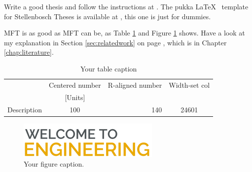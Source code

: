Write a good thesis and follow the instructions at \cite{sun_thesis_guide}. The pukka \LaTeX ~ template for Stellenbosch Theses is available at \cite{sun_latex_template}, this one is just for dummies.


\Ac{MFT} is as good as \ac{MFT} can be, as Table \ref{tab:my_label} and Figure \ref{fig:enter-label} shows.
Have a look at my explanation in Section \ref{sec:relatedwork} on page \pageref{sec:relatedwork}, which is in Chapter \ref{chap:literature}.



\begin{table}[H]
    \caption{Your table caption}
    \footnotesize
    \centering
    \begin{tabular}{ccrp{3cm}}    %
    \toprule
         & Centered number & R-aligned number &  Width-set col\\
         & [Units] & & \\
    \midrule
        Description & 100 & 140 & \multicolumn{1}{c}{24601}\\
    \bottomrule
    \end{tabular}
    \label{tab:my_label}
\end{table}

\begin{figure}
    \centering
    \includegraphics[width=0.8\linewidth]{figures/Faculty-of-Engineering-Stellenbosch-University-Logo.png}
    \caption{Your figure caption.}
    \label{fig:enter-label}
\end{figure}
